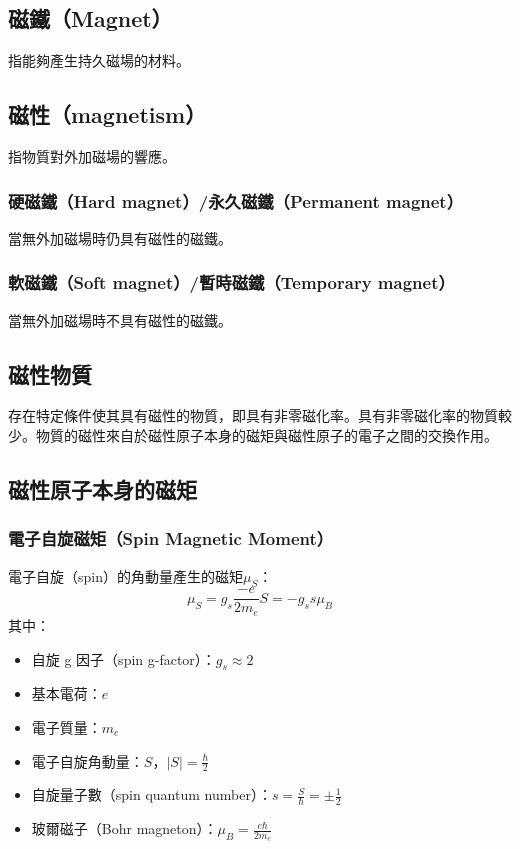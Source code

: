 \documentclass[a4paper,12pt]{report}
\begin{document}
\begin{itemize}
\subsection{磁鐵（Magnet）}
指能夠產生持久磁場的材料。
\subsection{磁性（magnetism）}
指物質對外加磁場的響應。
\subsubsection{硬磁鐵（Hard magnet）/永久磁鐵（Permanent magnet）}
當無外加磁場時仍具有磁性的磁鐵。
\subsubsection{軟磁鐵（Soft magnet）/暫時磁鐵（Temporary magnet）}
當無外加磁場時不具有磁性的磁鐵。
\subsection{磁性物質}
存在特定條件使其具有磁性的物質，即具有非零磁化率。具有非零磁化率的物質較少。物質的磁性來自於磁性原子本身的磁矩與磁性原子的電子之間的交換作用。
\subsection{磁性原子本身的磁矩}
\subsubsection{電子自旋磁矩（Spin Magnetic Moment）}
電子自旋（spin）的角動量產生的磁矩$\mu_S$：
\[\mu_S=g_s\frac{-e}{2m_e}S=-g_ss\mu_B\]
其中：
\begin{itemize}
\item 自旋 g 因子（spin g-factor）：$g_s\approx 2$
\item 基本電荷：$e$
\item 電子質量：$m_e$
\item 電子自旋角動量：$S$，$|S|=\frac{\hbar}{2}$
\item 自旋量子數（spin quantum number）：$s=\frac{S}{\hbar}=\pm\frac{1}{2}$
\item 玻爾磁子（Bohr magneton）：$\mu_B=\frac{e\hbar}{2m_e}$
\end{itemize}

\end{itemize}
\end{document}
